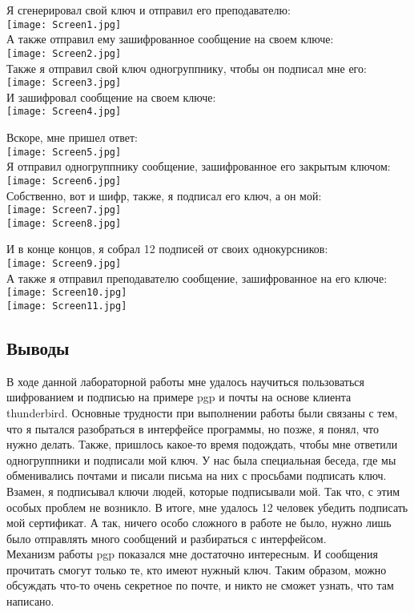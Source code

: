 \documentclass[12pt]{article}
\begin{document}
Я сгенерировал свой ключ и отправил его преподавателю:\\
\texttt{[image: Screen1.jpg]}\\

А также отправил ему зашифрованное сообщение на своем ключе:\\
\texttt{[image: Screen2.jpg]}\\

Также я отправил свой ключ одногруппнику, чтобы он подписал мне его:\\
\texttt{[image: Screen3.jpg]}\\

И зашифровал сообщение на своем ключе:\\
\texttt{[image: Screen4.jpg]}\\
\newpage

Вскоре, мне пришел ответ:\\
\texttt{[image: Screen5.jpg]}\\

Я отправил одногруппнику сообщение, зашифрованное его закрытым ключом:\\
\texttt{[image: Screen6.jpg]}\\

Собственно, вот и шифр, также, я подписал его ключ, а он мой:\\
\texttt{[image: Screen7.jpg]}\\
\texttt{[image: Screen8.jpg]}\\
\newpage

И в конце концов, я собрал 12 подписей от своих однокурсников:\\
\texttt{[image: Screen9.jpg]}\\

А также я отправил преподавателю сообщение, зашифрованное на его ключе:\\
\texttt{[image: Screen10.jpg]}\\
\texttt{[image: Screen11.jpg]}\\

\subsection*{Выводы}
В ходе данной лабораторной работы мне удалось научиться пользоваться шифрованием и подписью на примере pgp и почты на основе клиента thunderbird. Основные трудности при выполнении работы были связаны с тем, что я пытался разобраться в интерфейсе программы, но позже, я понял, что нужно делать. Также, пришлось какое-то время подождать, чтобы мне ответили одногруппники и подписали мой ключ. У нас была специальная беседа, где мы обменивались почтами и писали письма на них с просьбами подписать ключ. Взамен, я подписывал ключи людей, которые подписывали мой. Так что, с этим особых проблем не возникло. В итоге, мне удалось 12 человек убедить подписать мой сертификат. А так, ничего особо сложного в работе не было, нужно лишь было отправлять много сообщений и разбираться с интерфейсом. \\

Механизм работы pgp показался мне достаточно интересным. И сообщения прочитать смогут только те, кто имеют нужный ключ. Таким образом, можно обсуждать что-то очень секретное по почте, и никто не сможет узнать, что там написано.
\end{document}
